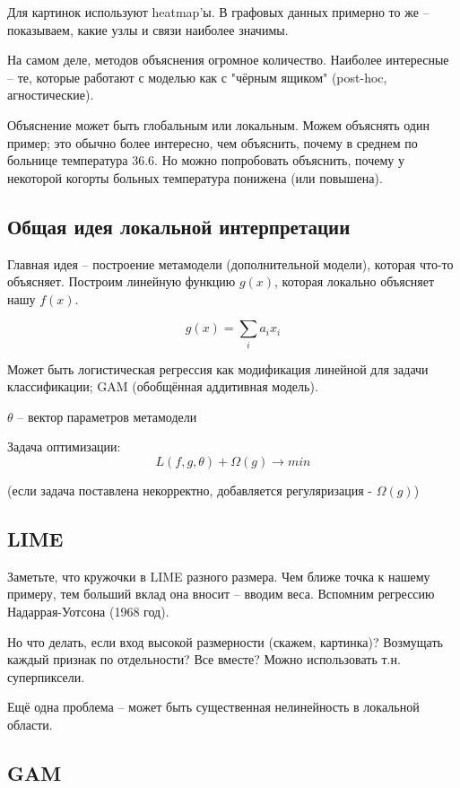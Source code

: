 \documentclass[a4paper,12pt]{article}
\begin{document}
Для картинок используют heatmap'ы.
В графовых данных примерно то же -- показываем, какие узлы и связи наиболее значимы.

На самом деле, методов объяснения огромное количество.
Наиболее интересные -- те, которые работают с моделью как с "чёрным ящиком"\hspace{0pt} (post-hoc, агностические).

Объяснение может быть глобальным или локальным.
Можем объяснять один пример; это обычно более интересно, чем объяснить, почему в среднем по больнице температура 36.6.
Но можно попробовать объяснить, почему у некоторой когорты больных температура понижена (или повышена).

\subsection{Общая идея локальной интерпретации}

Главная идея -- построение метамодели (дополнительной модели), которая что-то объясняет.
Построим линейную функцию $ g(x) $, которая локально объясняет нашу $ f(x) $.
 
\[ g(x) = \sum_i a_i x_i \]

Может быть логистическая регрессия как модификация линейной для задачи классификации; GAM (обобщённая аддитивная модель).

$ \theta $ -- вектор параметров метамодели

Задача оптимизации:
\[ L(f, g, \theta) + \Omega(g) \to min  \]

(если задача поставлена некорректно, добавляется регуляризация - $ \Omega(g) $)

\subsection{LIME}

Заметьте, что кружочки в LIME разного размера.
Чем ближе точка к нашему примеру, тем больший вклад она вносит -- вводим веса.
Вспомним регрессию Надаррая-Уотсона (1968 год).

Но что делать, если вход высокой размерности (скажем, картинка)?
Возмущать каждый признак по отдельности?
Все вместе?
Можно использовать т.н. суперпиксели.

Ещё одна проблема -- может быть существенная нелинейность в локальной области.

\subsection{GAM}
\end{document}
